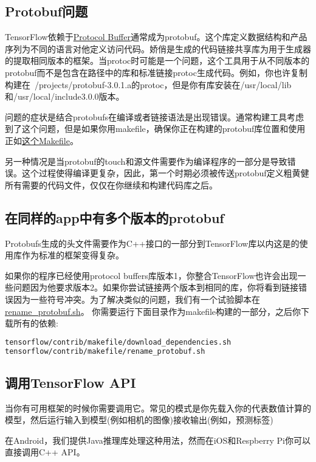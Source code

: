 \subsection{Protobuf问题}
TensorFlow依赖于\href{https://developers.google.com/protocol-buffers/}{Protocol Buffer}通常成为protobuf。这个库定义数据结构和产品序列为不同的语言对他定义访问代码。娇俏是生成的代码链接共享库为用于生成器的提取相同版本的框架。当protoc时可能是一个问题，这个工具用于从不同版本的protobuf而不是包含在路径中的库和标准链接protoc生成代码。例如，你也许复制构建在~/projects/protobuf-3.0.1.a的protoc，但是你有库安装在/usr/local/lib和/usr/local/include3.0.0版本。

问题的症状是结合protobufs在编译或者链接语法是出现错误。通常构建工具考虑到了这个问题，但是如果你用makefile，确保你正在构建的protobuf库位置和使用正如\href{https://github.com/tensorflow/tensorflow/blob/master/tensorflow/contrib/makefile/Makefile#L18}{这个Makefile}。

另一种情况是当protobuf的touch和源文件需要作为编译程序的一部分是导致错误。这个过程使得编译更复杂，因此，第一个时期必须被传送protobuf定义粗黄健所有需要的代码文件，仅仅在你继续和构建代码库之后。

\subsection{在同样的app中有多个版本的protobuf}
Protobufs生成的头文件需要作为C++接口的一部分到TensorFlow库以内这是的使用库作为标准的框架变得复杂。

如果你的程序已经使用protocol buffers库版本1，你整合TensorFlow也许会出现一些问题因为他要求版本2。如果你尝试链接两个版本到相同的库，你将看到链接错误因为一些符号冲突。为了解决类似的问题，我们有一个试验脚本在\href{https://github.com/tensorflow/tensorflow/blob/master/tensorflow/contrib/makefile/rename_protobuf.sh}{rename\_protobuf.sh}。
你需要运行下面目录作为makefile构建的一部分，之后你下载所有的依赖:
\begin{lstlisting}[language=Bash]
tensorflow/contrib/makefile/download_dependencies.sh
tensorflow/contrib/makefile/rename_protobuf.sh 
\end{lstlisting}
\subsection{调用TensorFlow API}
当你有可用框架的时候你需要调用它。常见的模式是你先载入你的代表数值计算的模型，然后运行输入到模型(例如相机的图像)接收输出(例如，预测标签)

在Android，我们提供Java推理库处理这种用法，然而在iOS和Respberry Pi你可以直接调用C++ API。
